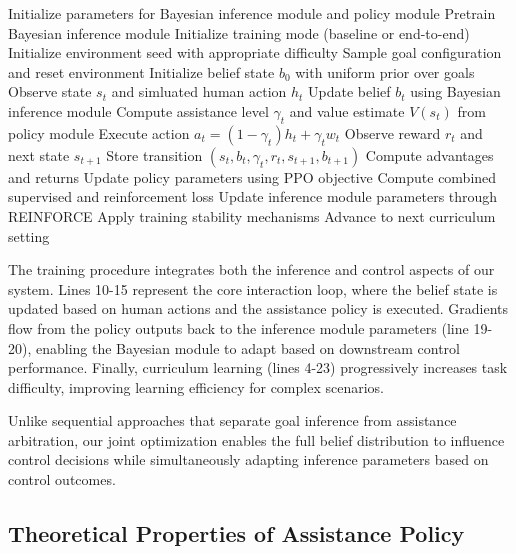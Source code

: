 \documentclass[11pt]{article}
\begin{document}
\begin{algorithm}
\caption{BRACE Training Algorithm}
\label{alg:training}
\begin{algorithmic}[1]
\State Initialize parameters for Bayesian inference module and policy module
\State Pretrain Bayesian inference module
\State Initialize training mode (baseline or end-to-end)
    \State Initialize environment seed with appropriate difficulty
        \State Sample goal configuration and reset environment
        \State Initialize belief state $b_0$ with uniform prior over goals
            \State Observe state $s_t$ and simluated human action $h_t$
            \State Update belief $b_t$ using Bayesian inference module
            \State Compute assistance level $\gamma_t$ and value estimate $V(s_t)$ from policy module
            \State Execute action $a_t = (1-\gamma_t)h_t + \gamma_t w_t$
            \State Observe reward $r_t$ and next state $s_{t+1}$
            \State Store transition $(s_t, b_t, \gamma_t, r_t, s_{t+1}, b_{t+1})$
        \EndFor
        \State Compute advantages and returns
        \State Update policy parameters using PPO objective
        \State Compute combined supervised and reinforcement loss
        \State Update inference module parameters through REINFORCE
        \State Apply training stability mechanisms
    \EndFor
    \State Advance to next curriculum setting
\EndFor
\end{algorithmic}
\end{algorithm}

The training procedure integrates both the inference and control aspects of our system. Lines 10-15 represent the core interaction loop, where the belief state is updated based on human actions and the assistance policy is executed. Gradients flow from the policy outputs back to the inference module parameters (line 19-20), enabling the Bayesian module to adapt based on downstream control performance. Finally, curriculum learning (lines 4-23) progressively increases task difficulty, improving learning efficiency for complex scenarios.

Unlike sequential approaches that separate goal inference from assistance arbitration, our joint optimization enables the full belief distribution to influence control decisions while simultaneously adapting inference parameters based on control outcomes.



\subsection{Theoretical Properties of Assistance Policy}
\end{document}
